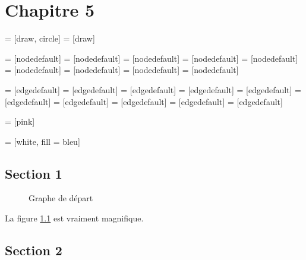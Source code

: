 
\chapter{Chapitre 5}



 = [draw, circle]
 = [draw]

 = [nodedefault]
 = [nodedefault]
 = [nodedefault]
 = [nodedefault]
 = [nodedefault]
 = [nodedefault]
 = [nodedefault]
 = [nodedefault]
 = [nodedefault]

 = [edgedefault]
 = [edgedefault]
 = [edgedefault]
 = [edgedefault]
 = [edgedefault]
 = [edgedefault]
 = [edgedefault]
 = [edgedefault]
 = [edgedefault]
 = [edgedefault]

 = [pink]

 = [white, fill = bleu]

\section{Section 1}

\begin{figure}
  \centering
    
  \begin{tikzpicture}[every node/.style = {nodedefault}, every path/.style = {edgedefault}] 
    
  \end{tikzpicture}
    
  \caption{Graphe de départ}
  \label{fig:graphe}
\end{figure}

La figure \ref{fig:graphe} est vraiment magnifique.

\section{Section 2}

